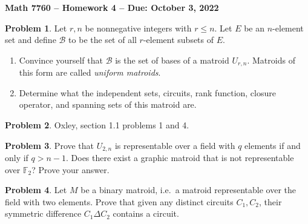 \documentclass[letterpaper,11pt]{amsart}
\theoremstyle{plain}
\theoremstyle{definition}
\newtheorem{pr}{Problem}
\theoremstyle{remark}
\begin{document}
\Large

\begin{center}
{\bf Math 7760 -- Homework  4 --  Due:  October 3, 2022}
\end{center}

\normalsize


\bigskip


\bigskip

\begin{pr}
    Let $r,n$ be nonnegative integers with $r \le n$.
    Let $E$ be an $n$-element set and define $\mathcal{B}$ to be the set of all $r$-element subsets of $E$.
    \begin{enumerate}
        \item Convince yourself that $\mathcal{B}$ is the set of bases of a matroid $U_{r,n}$.
        Matroids of this form are called \emph{uniform matroids}.
        \item Determine what the independent sets, circuits, rank function, closure operator, and spanning sets of this matroid are.
    \end{enumerate}
\end{pr}

\begin{pr}
    Oxley, section 1.1 problems 1 and 4.
\end{pr}

\bigskip

\bigskip

\begin{pr}
    Prove that $U_{2,n}$ is representable over a field with $q$ elements if and only if $q > n-1$.
    Does there exist a graphic matroid that is not representable over $\mathbb{F}_2$? Prove your answer.
\end{pr}

\begin{pr}
    Let $M$ be a binary matroid, i.e.~a matroid representable over the field with two elements.
    Prove that given any distinct circuits $C_1,C_2$, their symmetric difference $C_1 \Delta C_2$ contains a circuit.
\end{pr}

\bigskip
\end{document}

